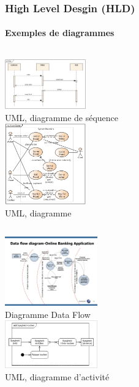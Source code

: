 \documentclass{beamer}
\begin{document}
    \begin{frame}
        \transdissolve
        \frametitle{High Level Desgin (HLD)}
        \framesubtitle{Exemples de diagrammes}
        \begin{columns}
            \centering
            \includegraphics[width=3.5cm]{image/uml-sequence-diagram} \\ UML, diagramme de séquence \\
            \centering
            \includegraphics[width=3.5cm]{image/uml-use-case-diagram} \\ UML, diagramme  \\
        \end{columns}
        \begin{columns}
            \centering
            \includegraphics[width=4cm]{image/data-flow-diagramm-online-banking-application} \\ Diagramme Data Flow \\
            \centering
            \includegraphics[width=4cm]{image/uml-activity-diagram} \\ UML, diagramme d'activité \\
        \end{columns}
    \end{frame}
\end{document}

